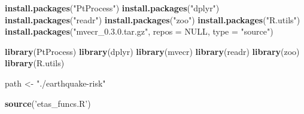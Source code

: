 \documentclass[
]{article}
\newenvironment{Shaded}{\begin{snugshade}}{\end{snugshade}}
\newcommand{\DataTypeTok}[1]{\textcolor[rgb]{0.13,0.29,0.53}{#1}}
\newcommand{\KeywordTok}[1]{\textcolor[rgb]{0.13,0.29,0.53}{\textbf{#1}}}
\newcommand{\NormalTok}[1]{#1}
\newcommand{\OtherTok}[1]{\textcolor[rgb]{0.56,0.35,0.01}{#1}}
\newcommand{\StringTok}[1]{\textcolor[rgb]{0.31,0.60,0.02}{#1}}
\begin{document}
\begin{Shaded}
\begin{Highlighting}[]
\KeywordTok{install.packages}\NormalTok{(}\StringTok{"PtProcess"}\NormalTok{)}
\KeywordTok{install.packages}\NormalTok{(}\StringTok{"dplyr"}\NormalTok{)}
\KeywordTok{install.packages}\NormalTok{(}\StringTok{"readr"}\NormalTok{)}
\KeywordTok{install.packages}\NormalTok{(}\StringTok{"zoo"}\NormalTok{)}
\KeywordTok{install.packages}\NormalTok{(}\StringTok{"R.utils"}\NormalTok{)}
\KeywordTok{install.packages}\NormalTok{(}\StringTok{"mvecr_0.3.0.tar.gz"}\NormalTok{, }\DataTypeTok{repos =} \OtherTok{NULL}\NormalTok{, }\DataTypeTok{type =} \StringTok{"source"}\NormalTok{)}

\KeywordTok{library}\NormalTok{(PtProcess)}
\KeywordTok{library}\NormalTok{(dplyr)}
\KeywordTok{library}\NormalTok{(mvecr)}
\KeywordTok{library}\NormalTok{(readr)}
\KeywordTok{library}\NormalTok{(zoo)}
\KeywordTok{library}\NormalTok{(R.utils)}

\NormalTok{path <-}\StringTok{ "./earthquake-risk"}

\KeywordTok{source}\NormalTok{(}\StringTok{'etas_funcs.R'}\NormalTok{)}



\end{Highlighting}
\end{Shaded}
\end{document}
